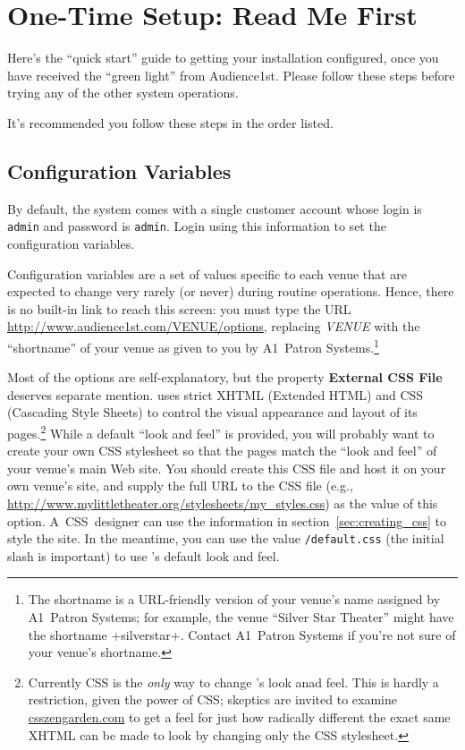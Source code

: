 \section{One-Time Setup: Read Me First}

Here's the ``quick start'' guide to getting your installation
configured, once you have received the ``green light'' from
Audience1st.  Please follow these steps before trying any of the other
system operations.

It's recommended you follow these steps in the order listed.

\subsection{Configuration Variables}
\label{sec:config-vars}

By default, the system comes with a single customer account whose login
is \verb+admin+ and password is \verb+admin+.  Login using this
information to set the configuration variables.

Configuration variables are a set of values specific to each venue that
are expected to change very rarely (or never) during routine operations.
Hence, there is no built-in link to reach this screen: you must type the
URL \url{http://www.audience1st.com/VENUE/options}, replacing
\emph{VENUE} with the ``shortname'' of your venue as given to you by
A1~Patron Systems.\footnote{The shortname is a URL-friendly version of your
venue's name assigned by A1~Patron Systems; for example, the venue
``Silver Star Theater'' might have the shortname \venue+silverstar+.
Contact A1~Patron Systems if you're not sure of your venue's shortname.}

Most of the options are self-explanatory, but the property
\textbf{External CSS File} deserves separate mention.  \af uses strict
XHTML (Extended HTML) and CSS (Cascading Style Sheets) to control the
visual appearance and layout of its pages.\footnote{Currently CSS is the
  \emph{only} way to change \af's look anad feel.  This is hardly a
  restriction, given the power of CSS; skeptics are invited to examine
  \url{csszengarden.com} to get a feel for just how radically different
  the exact same XHTML can be made to look by changing only the CSS
  stylesheet.} 
While a default ``look and
feel'' is provided, you will probably want to create your own CSS
stylesheet so that the \af pages match the ``look and feel'' of your
venue's main Web site.  You should create this CSS file and host it on
your own venue's site, and supply the full URL to the CSS file (e.g.,
\url{http://www.mylittletheater.org/stylesheets/my_styles.css}) as the
value of this option.  A~CSS~designer can use the
information in section~\ref{sec:creating_css} to style the site.  In the
meantime, you can use the value \verb+/default.css+ (the initial slash
is important) to use \af's default look and feel.

